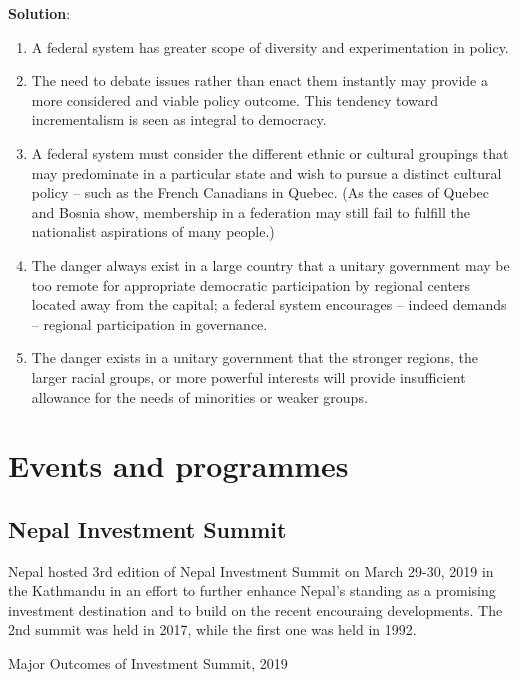 \documentclass[
  openany]{book}
\newenvironment{solution}{ {\bfseries Solution}:}{}
\begin{document}
\begin{questions}
\begin{solution}
\begin{enumerate}
\item A federal system has greater scope of diversity and experimentation in policy.
\item The need to debate issues rather than enact them instantly may provide a more considered and viable policy outcome. This tendency toward incrementalism is seen as integral to democracy.
\item A federal system must consider the different ethnic or cultural groupings that may predominate in a particular state and wish to pursue a distinct cultural policy -- such as the French Canadians in Quebec. (As the cases of Quebec and Bosnia show, membership in a federation may still fail to fulfill the nationalist aspirations of many people.)
\item The danger always exist in a large country that a unitary government may be too remote for appropriate democratic participation by regional centers located away from the capital; a federal system encourages -- indeed demands -- regional participation in governance.
\item The danger exists in a unitary government that the stronger regions, the larger racial groups, or more powerful interests will provide insufficient allowance for the needs of minorities or weaker groups.
\end{enumerate}
\end{solution}

\end{questions}

\hypertarget{events-and-programmes}{%
\section{Events and programmes}\label{events-and-programmes}}

\hypertarget{nepal-investment-summit}{%
\subsection{Nepal Investment Summit}\label{nepal-investment-summit}}

Nepal hosted 3rd edition of Nepal Investment Summit on March 29-30, 2019 in the Kathmandu in an effort to further enhance Nepal's standing as a promising investment destination and to build on the recent encouraing developments. The 2nd summit was held in 2017, while the first one was held in 1992.

Major Outcomes of Investment Summit, 2019
\end{document}
